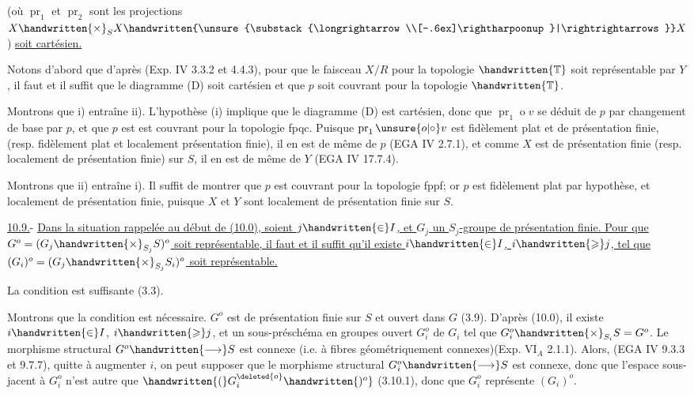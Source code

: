 (où $\operatorname{pr}_1$ et $\operatorname{pr}_2$ sont les projections $X\handwritten{\times}_S X\handwritten{\unsure{\substack{\longrightarrow\\[-.6ex]\rightharpoonup}|\rightrightarrows}}X$) \uline{soit cartésien.}

Notons d'abord que d'après (Exp. IV 3.3.2 et 4.4.3), pour que le faisceau $X/R$  pour la topologie $\handwritten{\mathbb{T}}$ soit représentable par $Y$, il faut et il suffit que le diagramme (D) soit cartésien et que $p$ soit couvrant pour la topologie $\handwritten{\mathbb{T}}$.

Montrons que i) entraîne ii). L'hypothèse (i) implique que le diagramme (D) est cartésien, donc que $\operatorname{pr}_1\mathbin{o} v$ se déduit de $p$ par changement de base par $p$, et que $p$ est
est couvrant pour la topologie fpqc. Puisque $\operatorname{pr}_1\mathbin{\unsure{o|\circ}} v$ est fidèlement plat et de présentation finie, (resp. fidèlement plat et localement  présentation finie), il en est de même de $p$ (EGA IV 2.7.1), et comme $X$ est de présentation finie (resp. localement de présentation finie) sur $S$, il en est de même de $Y$ (EGA IV 17.7.4).

Montrons que ii) entraîne i). Il suffit de montrer que $p$ est couvrant pour la topologie fppf; or $p$ est fidèlement plat par hypothèse, et localement de présentation finie, puisque $X$ et $Y$ sont localement de présentation finie sur $S$.

\uline{10.9.}- \uline{Dans la situation rappelée au début de (10.0), soient $j\handwritten{\in}I$, et $G_j$ un $S_j$-groupe de présentation finie. Pour que $G^o=(G_j\handwritten{\times}_{S_j}S)^o$ soit représentable, il faut et il suffit qu'il existe  $i\handwritten{\in}I$, $i\handwritten{\geqslant}j$, tel que $(G_i)^o=(G_j\handwritten{\times}_{S_j}S_i)^o$ soit représentable.}

La condition est suffisante (3.3).

Montrons que la condition est nécessaire.  $G^o$ est de présentation finie sur $S$ et ouvert dans $G$ (3.9). D'après (10.0), il existe $i\handwritten{\in}I$, $i\handwritten{\geqslant}j$, et un sous-préschéma en groupes ouvert $G_i^o$ de $G_i$ tel que $G_i^o\handwritten{\times}_{S_i}S=G^o$. Le morphisme structural $G^o\handwritten{\longrightarrow}S$ est connexe (i.e. à fibres géométriquement connexes)(Exp. $\mathrm{VI}_A$ 2.1.1). Alors, (EGA IV 9.3.3 et 9.7.7), quitte à augmenter $i$, on peut supposer que le morphisme structural $G_i^o\handwritten{\longrightarrow}S$ est connexe, donc que l'espace sous-jacent à $G_i^o$ n'est autre que \uline{$\handwritten{(}G_i^{\deleted{o}}\handwritten{)^o}$} (3.10.1), donc que $G_i^o$ représente $(G_i)^o$.

